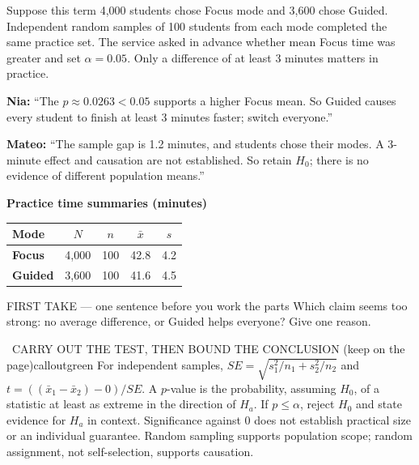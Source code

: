 \documentclass[11pt]{article}
\begin{document}


Suppose this term 4{,}000 students chose Focus mode and 3{,}600 chose Guided. Independent random samples of 100 students from each mode completed the same practice set. The service asked in advance whether mean Focus time was greater and set $\alpha=0.05$. Only a difference of at least 3 minutes matters in practice.\par\smallskip \textbf{Nia:} ``The $p\approx0.0263<0.05$ supports a higher Focus mean. So Guided causes every student to finish at least 3 minutes faster; switch everyone.''\par \textbf{Mateo:} ``The sample gap is 1.2 minutes, and students chose their modes. A 3-minute effect and causation are not established. So retain $H_0$; there is no evidence of different population means.''\par
\begin{center}
\textbf{Practice time summaries (minutes)}\par\smallskip
\begin{tabular}{|l|c|c|c|c|}
\hline
\textbf{Mode} & \textbf{$N$} & \textbf{$n$} & \textbf{$\bar x$} & \textbf{$s$} \\ \hline
\textbf{Focus} & 4{,}000 & 100 & 42.8 & 4.2 \\ \hline
\textbf{Guided} & 3{,}600 & 100 & 41.6 & 4.5 \\ \hline
\end{tabular}
\end{center}
\begin{firsttakebox}{FIRST TAKE --- one sentence before you work the parts}
Which claim seems too strong: no average difference, or Guided helps everyone? Give one reason.
\workspace{0.7in}
\end{firsttakebox}

\begin{callout}{\IconBook\ CARRY OUT THE TEST, THEN BOUND THE CONCLUSION (keep on the page)}{calloutgreen}
For independent samples, $SE=\sqrt{s_1^2/n_1+s_2^2/n_2}$ and
$t=((\bar x_1-\bar x_2)-0)/SE$. A $p$-value is the probability, assuming $H_0$,
of a statistic at least as extreme in the direction of $H_a$. If $p\leq\alpha$, reject
$H_0$ and state evidence for $H_a$ in context. Significance against 0 does not establish
practical size or an individual guarantee. Random sampling supports population scope;
random assignment, not self-selection, supports causation.
\end{callout}
\end{document}
